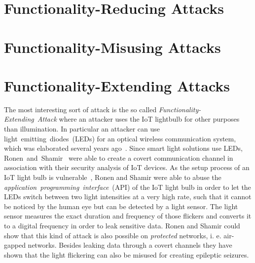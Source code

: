 \documentclass[11pt,a4paper]{article}
\begin{document}
	\section{Functionality-Reducing Attacks}%
	\label{sec:functionality_reducing_attacks}


	\section{Functionality-Misusing Attacks}%
	\label{sec:functionality_misusing_attacks}

	\section{Functionality-Extending Attacks}%
	\label{sec:functionality_extending_attacks}
	The most interesting sort of attack is the so called \textit{Functionality-Extending~Attack} where an attacker uses the IoT lightbulb for other purposes than illumination. In particular an attacker can use light~emitting~diodes~(LEDs) for an optical wireless communication system, which was elaborated several years ago~\cite{Komine:2004:FAfVLCSuLL, Elgala:2007:OVLWCBoWL}. Since smart light solutions use LEDs, Ronen~and~Shamir~\cite{Ronen:2016:EFAIDCSL} were able to create a covert communication channel in association with their security analysis of IoT devices. As the setup process of an IoT light bulb is vulnerable~\cite{Dhanjani:2013:HLSEPHPWLS, Morgner:2016:AYBBUICSSCLS, Ronen:2018:IGNCZCR}, Ronen and Shamir were able to abuse the \textit{application~programming~interface}~(API) of the IoT light bulb in order to let the LEDs switch between two light intensities at a very high rate, such that it cannot be noticed by the human eye but can be detected by a light sensor. The light sensor measures the exact duration and frequency of those flickers and converts it to a digital frequency in order to leak sensitive data. Ronen and Shamir could show that this kind of attack is also possible on \textit{protected} networks, i. e. air-gapped networks. Besides leaking data through a covert channels they have shown that the light flickering can also be misused for creating epileptic seizures.

	\newpage

	
	
\end{document}
